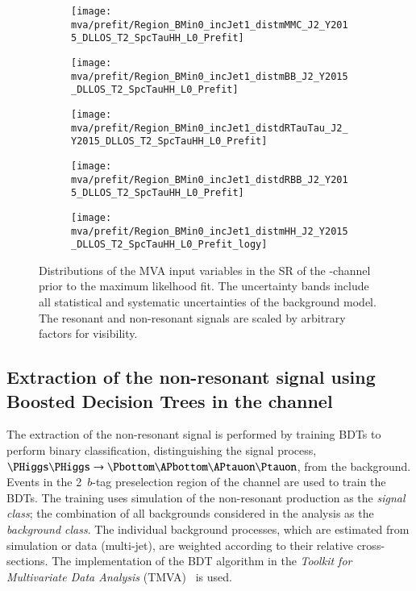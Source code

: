 \begin{figure}[htbp]
  \centering

  \begin{subfigure}[t]{.48\textwidth}
    \texttt{[image: mva/prefit/Region\_BMin0\_incJet1\_distmMMC\_J2\_Y2015\_DLLOS\_T2\_SpcTauHH\_L0\_Prefit]}
  \end{subfigure}\hfill %
  \begin{subfigure}[t]{.48\textwidth}
    \texttt{[image: mva/prefit/Region\_BMin0\_incJet1\_distmBB\_J2\_Y2015\_DLLOS\_T2\_SpcTauHH\_L0\_Prefit]}
  \end{subfigure}

  \begin{subfigure}[t]{.48\textwidth}
    \texttt{[image: mva/prefit/Region\_BMin0\_incJet1\_distdRTauTau\_J2\_Y2015\_DLLOS\_T2\_SpcTauHH\_L0\_Prefit]}
  \end{subfigure}\hfill %
  \begin{subfigure}[t]{.48\textwidth}
    \texttt{[image: mva/prefit/Region\_BMin0\_incJet1\_distdRBB\_J2\_Y2015\_DLLOS\_T2\_SpcTauHH\_L0\_Prefit]}
  \end{subfigure}

  \begin{subfigure}[t]{.48\textwidth}
    \texttt{[image: mva/prefit/Region\_BMin0\_incJet1\_distmHH\_J2\_Y2015\_DLLOS\_T2\_SpcTauHH\_L0\_Prefit\_logy]}
  \end{subfigure}

  \caption{Distributions of the MVA input variables in the SR of the
    \hadhad-channel prior to the maximum likelhood fit. The
    uncertainty bands include all statistical and systematic
    uncertainties of the background model. The resonant and
    non-resonant \HH signals are scaled by arbitrary factors for visibility.}
  \label{fig:mva_inputs}
\end{figure}


\subsection{Extraction of the non-resonant signal using Boosted
  Decision Trees in the \hadhad channel}
\label{sec:mva_smbdt}

The extraction of the non-resonant \HH signal is performed by training
BDTs to perform binary classification, distinguishing the signal
process, $\HH \to \bbtautau$, from the background. Events in the
2~$b$-tag preselection region of the \hadhad channel are used to train
the BDTs. The training uses simulation of the non-resonant \HH
production as the \emph{signal class}; the combination of all
backgrounds considered in the analysis as the \emph{background class}.
The individual background processes, which are estimated from
simulation or data (multi-jet), are weighted according to their
relative cross-sections. The implementation of the BDT algorithm in
the \emph{Toolkit for Multivariate Data Analysis}
(TMVA)~\cite{Hocker:2007ht} is used.

